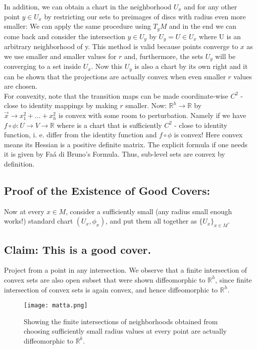 \documentclass[12pt]{amsart}
\theoremstyle{remark}
\begin{document}
\indent In addition, we can obtain a chart in the neighborhood $U_x$ and for any other point $y \in U_x$ by restricting our sets to preimages of discs with radius even more smaller: We can apply the same procedure using $T_y M$ and in the end we can come back and consider the intersection $y\in U_y$ by $ U_y = U \in U_x $ where U is an arbitrary neighborhood of y. This method is valid because points converge to $x$ as we use smaller and smaller values for $r$ and, furthermore, the sets $U_y$ will be converging to a set inside $U_x$. Now this $U_y$ is also a chart by its own right and it can be shown that the projections are actually convex when even smaller $r$ values are chosen. \\
\indent For convexity, note that the transition maps can be made coordinate-wise $C^2 $ - close to identity mappings by making $r$ smaller. Now: $\mathbb{R} ^ h \longrightarrow \mathbb{R}$ by $\Vec{x} \rightarrow x_1 ^2 + ... + x_h ^2 $ is convex with some room to perturbation. Namely if we have $f \circ \phi: U \rightarrow V \rightarrow \mathbb{R}$ where is a chart that is sufficiently $C^2$ - close to identity function, i. e. differ from the identity function and $f\circ \phi$ is convex! Here convex means its Hessian is a positive definite matrix. The explicit formula if one needs it is given by Faá di Bruno's Formula. Thus, sub-level sets are convex by definition. 

\subsection{Proof of the Existence of Good Covers:} 

\indent Now at every $x\in M$, consider a sufficiently small (any radius small enough works!) standard chart $(U_x ,\phi_{x})$, and put them all together as $\{U_x\}_{x\in M}.$

\subsection*{Claim: This is a good cover.} \indent Project from a point in any intersection. We observe that a finite intersection of convex sets are also open subset that were shown diffeomorphic to $\mathbb{R}^h$, since finite intersection of convex sets is again convex, and hence diffeomorphic to $\mathbb{R} ^h$.

\begin{figure}[h]
    \centering
    \texttt{[image: matta.png]}
    \caption{Showing the finite intersections of neighborhoods obtained from choosing sufficiently small radius values at every point are actually diffeomorphic to $\mathbb{R}^{k}$.}
    \label{fig:circles_intertg}
\end{figure} 
\end{document}

